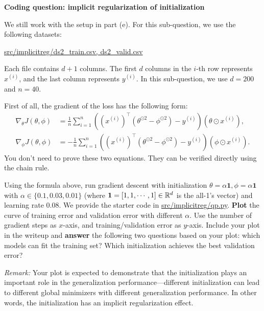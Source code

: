 \item{}\textbf{} \textbf{Coding question: implicit regularization of initialization}

We still work with the setup in part (e).
For this sub-question, we use the following datasets:
\begin{center}
	\url{src/implicitreg/ds2_train.csv, ds2_valid.csv}
\end{center}
Each file contains $d+1$ columns. The first $d$ columns in the $i$-th row represents $x^{(i)}$, and the last column represents $y^{(i)}.$ In this sub-question, we use $d=200$ and $n=40$.

First of all, the gradient of the loss has the following form:
\begin{align}
	\nabla_\theta J(\theta,\phi)&=\frac{1}{n}\sum_{i=1}^{n}((x^{(i)})^\top (\theta^{\odot 2} -\phi^{\odot 2})-y^{(i)})(\theta\odot x^{(i)}),\\
	\nabla_\phi J(\theta,\phi)&=-\frac{1}{n}\sum_{i=1}^{n}((x^{(i)})^\top (\theta^{\odot 2} -\phi^{\odot 2})-y^{(i)})(\phi\odot x^{(i)}).
\end{align}
You don't need to prove these two equations. They can be verified directly using the chain rule.

Using the formula above, run gradient descent with initialization $\theta=\alpha \mathbf{1}, \phi=\alpha\mathbf{1}$ with $\alpha\in \{0.1, 0.03, 0.01\}$ (where $\mathbf{1}=[1,1,\cdots,1]\in\mathbb{R}^{d}$ is the all-1's vector) and learning rate $0.08$. We provide the starter code in \url{src/implicitreg/qp.py}. \textbf{Plot} the curve of training error and validation error with different $\alpha$. Use the number of gradient steps as $x$-axis, and training/validation error as $y$-axis. Include your plot in the writeup and \textbf{answer} the following two questions based on your plot: which models can fit the training set? Which initialization achieves the best validation error? 

\textit{Remark:} Your plot is expected to demonstrate that the initialization plays an important role in the generalization performance---different initialization can lead to different global minimizers with different generalization performance. In other words, the initialization has an implicit regularization effect. 